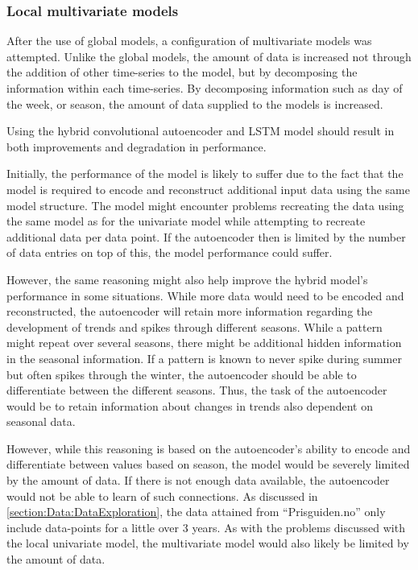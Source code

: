 \subsubsection{Local multivariate models}

After the use of global models, a configuration of multivariate models was attempted.
Unlike the global models, the amount of data is increased not through the addition of other time-series to the model,
but by decomposing the information within each time-series.
By decomposing information such as day of the week, or season, the amount of data supplied to the models is increased.


Using the hybrid convolutional autoencoder and LSTM model should result in both improvements and degradation in performance.

Initially, the performance of the model is likely to suffer due to the fact that
the model is required to encode and reconstruct additional input data using the same model structure.
The model might encounter problems recreating the data using the same model as for the univariate model
while attempting to recreate additional data per data point.
If the autoencoder then is limited by the number of data entries on top of this, the model performance could suffer.

However, the same reasoning might also help improve the hybrid model's performance in some situations.
While more data would need to be encoded and reconstructed, the autoencoder will retain more information
regarding the development of trends and spikes through different seasons.
While a pattern might repeat over several seasons, there might be additional hidden information in the seasonal information.
If a pattern is known to never spike during summer but often spikes through the winter,
the autoencoder should be able to differentiate between the different seasons.
Thus, the task of the autoencoder would be to retain information about changes in trends also dependent on seasonal data.


However, while this reasoning is based on the autoencoder's ability to encode and differentiate between values based on season,
the model would be severely limited by the amount of data.
If there is not enough data available, the autoencoder would not be able to learn of such connections.
As discussed in \cref{section:Data:DataExploration}, the data attained from ``Prisguiden.no'' only include data-points
for a little over 3 years.
As with the problems discussed with the local univariate model, the multivariate model would also likely be limited by the amount of data.

